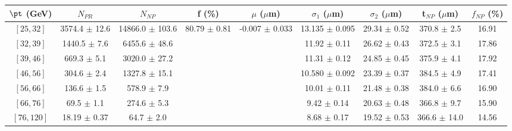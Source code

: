 \begin{tabular}{c||c|c|c|c|c|c|c||c}
$\pt$ (GeV) & $N_{PR}$ & $N_{NP}$ & f (\%) & $\mu$ ($\mu$m) & $\sigma_1$ ($\mu$m) & $\sigma_2$ ($\mu$m)  & t$_{NP}$ ($\mu$m) & $f_{NP}$ (\%) \\
\hline
$[25, 32]$ & 3574.4 $\pm$ 12.6 & 14866.0 $\pm$ 103.6 & \multirow{7}{*}{80.79 $\pm$ 0.81} & \multirow{7}{*}{-0.007 $\pm$ 0.033} & 13.135 $\pm$ 0.095 & 29.34 $\pm$ 0.52 & 370.8 $\pm$ 2.5 & 16.91\\
$[32, 39]$ & 1440.5 $\pm$ 7.6 & 6455.6 $\pm$ 48.6 &  &  & 11.92 $\pm$ 0.11 & 26.62 $\pm$ 0.43 & 372.5 $\pm$ 3.1 & 17.86\\
$[39, 46]$ & 669.3 $\pm$ 5.1 & 3020.0 $\pm$ 27.2 &  &  & 11.31 $\pm$ 0.12 & 24.85 $\pm$ 0.45 & 375.9 $\pm$ 4.1 & 17.92\\
$[46, 56]$ & 304.6 $\pm$ 2.4 & 1327.8 $\pm$ 15.1 &  &  & 10.580 $\pm$ 0.092 & 23.39 $\pm$ 0.37 & 384.5 $\pm$ 4.9 & 17.41\\
$[56, 66]$ & 136.6 $\pm$ 1.5 & 578.9 $\pm$ 7.9 &  &  & 10.01 $\pm$ 0.11 & 21.48 $\pm$ 0.38 & 384.0 $\pm$ 6.6 & 16.90\\
$[66, 76]$ & 69.5 $\pm$ 1.1 & 274.6 $\pm$ 5.3 &  &  & 9.42 $\pm$ 0.14 & 20.63 $\pm$ 0.48 & 366.8 $\pm$ 9.7 & 15.90\\
$[76, 120]$ & 18.19 $\pm$ 0.37 & 64.7 $\pm$ 2.0 &  &  & 8.68 $\pm$ 0.17 & 19.52 $\pm$ 0.53 & 366.6 $\pm$ 14.0 & 14.56\\
\end{tabular}
